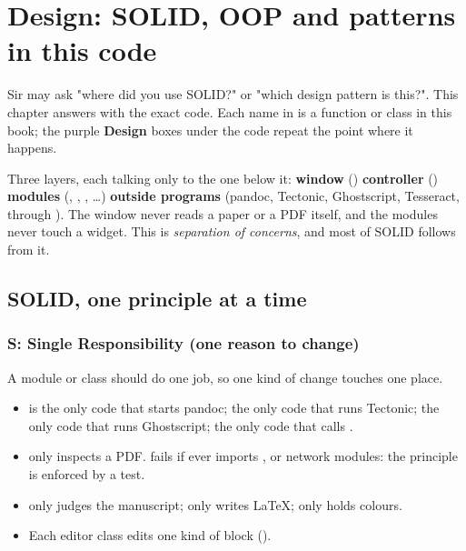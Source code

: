 \chapter{Design: SOLID, OOP and patterns in this code}

Sir may ask "where did you use SOLID?" or "which design pattern is this?". This chapter answers with the exact code.
Each name in  is a function or class in this book; the purple \textbf{Design} boxes under the code repeat the point where it happens.

\begin{keyidea}
Three layers, each talking only to the one below it:
\textbf{window} () \textrightarrow{} \textbf{controller} () \textrightarrow{} \textbf{modules} (, , , \dots) \textrightarrow{} \textbf{outside programs} (pandoc, Tectonic, Ghostscript, Tesseract, through ).
The window never reads a paper or a PDF itself, and the modules never touch a widget. This is \emph{separation of concerns}, and most of SOLID follows from it.
\end{keyidea}

\section{SOLID, one principle at a time}

\subsection*{S: Single Responsibility (one reason to change)}
A module or class should do one job, so one kind of change touches one place.
\begin{itemize}
\item \hyperref[u:pandoc:_run]{} is the only code that starts pandoc; \hyperref[u:compile:compile_pdf]{} the only code that runs Tectonic; \hyperref[u:fix:embed_fonts]{} the only code that runs Ghostscript; \hyperref[u:process:run_tool]{} the only code that calls .
\item \hyperref[u:checks:PdfChecks]{} only inspects a PDF.  fails if  ever imports ,  or network modules: the principle is enforced by a test.
\item \hyperref[m:analyze]{} only judges the manuscript; \hyperref[m:renderer]{} only writes LaTeX; \hyperref[m:ui/style]{} only holds colours.
\item Each editor class edits one kind of block (\hyperref[m:ui/editors]{}).
\end{itemize}

